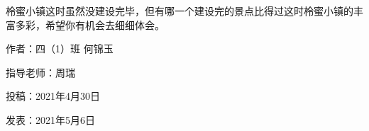 柃蜜小镇这时虽然没建设完毕，但有哪一个建设完的景点比得过这时柃蜜小镇的丰富多彩，希望你有机会去细细体会。

\vspace{10pt}

作者：四（1）班  何锦玉



指导老师：周瑞




投稿：2021年4月30日



发表：2021年5月6日













\vspace{10pt}

\hline




